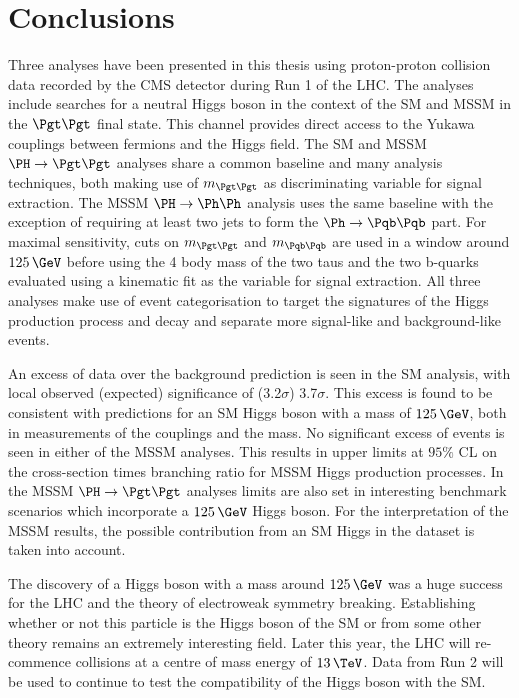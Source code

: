 \chapter{Conclusions}
\label{chap:conclusion}

Three analyses have been presented in this thesis using proton-proton collision
data recorded by the CMS detector during Run 1 of the LHC. The analyses include
searches for a neutral Higgs boson in the context of the \ac{SM} and \ac{MSSM}
in the $\Pgt\Pgt$ final state. This channel provides direct access to the Yukawa
couplings between fermions and the Higgs field. The \ac{SM} and \ac{MSSM}
$\PH\to\Pgt\Pgt$ analyses share a common baseline and many analysis techniques,
both making use of $m_{\Pgt\Pgt}$ as discriminating variable for signal
extraction. The \ac{MSSM} $\PH\to\Ph\Ph$ analysis uses the same baseline with
the exception of requiring at least two jets to form the $\Ph\to\Pqb\Pqb$ part.
For maximal sensitivity, cuts on $m_{\Pgt\Pgt}$ and $m_{\Pqb\Pqb}$ are used in a
window around $125\,\GeV$ before using the 4 body mass of the two taus and the 
two b-quarks evaluated using a kinematic fit as the variable for
signal extraction. All three analyses make use of event categorisation to target 
the signatures of the Higgs production process and decay and separate more signal-like and
background-like events.

An excess of data over the background prediction is seen in the \ac{SM}
analysis, with local observed (expected) significance of (3.2$\sigma$)
3.7$\sigma$. This excess is found to be consistent with predictions for an
\ac{SM} Higgs boson with a mass of $125\,\GeV$, both in measurements of the
couplings and the mass. No significant excess of events is seen in either of the
\ac{MSSM} analyses. This results in upper limits at $95\%$ CL on the
cross-section times branching ratio for \ac{MSSM} Higgs production processes. In
the \ac{MSSM} $\HToTauTau$ analyses limits are also set in interesting benchmark
scenarios which incorporate a $125\,\GeV$ Higgs boson. For the interpretation of
the \ac{MSSM} results, the possible contribution from an \ac{SM} Higgs in the
dataset is taken into account. 

The discovery of a Higgs boson with a mass around $125\,\GeV$ was a huge success 
for the LHC and the theory of electroweak symmetry breaking. Establishing
whether or not this particle is the Higgs boson of the \ac{SM} or from some
other theory remains an extremely interesting field. Later this year, the LHC
will re-commence collisions at a centre of mass energy of $13\,\TeV$. Data from
Run 2 will be used to continue to test the compatibility of the Higgs boson with
the \ac{SM}.

